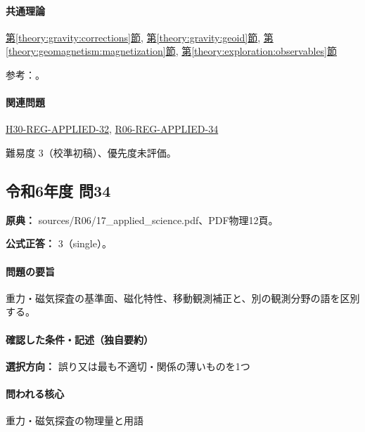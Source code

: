 \paragraph{共通理論} \hyperref[theory:gravity:corrections]{第\ref*{theory:gravity:corrections}節}, \hyperref[theory:gravity:geoid]{第\ref*{theory:gravity:geoid}節}, \hyperref[theory:geomagnetism:magnetization]{第\ref*{theory:geomagnetism:magnetization}節}, \hyperref[theory:exploration:observables]{第\ref*{theory:exploration:observables}節}

\par 参考：\cite{gsi_gravity_definitions,kanaya_okuma2011}。

\paragraph{関連問題} \hyperref[q:h30-reg-applied-32]{H30-REG-APPLIED-32}, \hyperref[q:r06-reg-applied-34]{R06-REG-APPLIED-34}

\par 難易度 3（校準初稿）、優先度未評価。

\subsection{令和6年度 問34}
\label{q:r06-reg-applied-34}

\noindent\textbf{原典：} sources/R06/17\_applied\_science.pdf、PDF物理12頁。

\textbf{公式正答：} 3（single）。

\paragraph{問題の要旨} 重力・磁気探査の基準面、磁化特性、移動観測補正と、別の観測分野の語を区別する。

\paragraph{確認した条件・記述（独自要約）}\mbox{}\par

\noindent\textbf{選択方向：} 誤り又は最も不適切・関係の薄いものを1つ\par

\paragraph{問われる核心} 重力・磁気探査の物理量と用語

